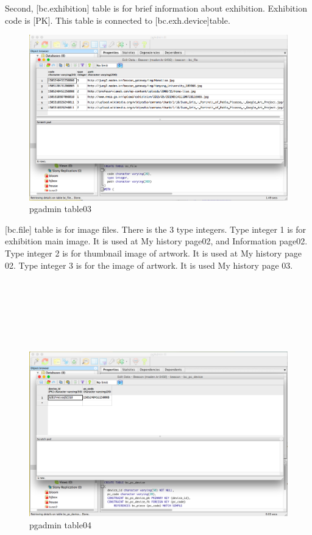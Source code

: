 \documentclass[conference]{IEEEtran}
\begin{document}
Second, [bc.exhibition] table is for  brief information about exhibition. Exhibition code is  [PK]. This table is connected to [bc.exh.device]table.\\

\begin{figure}[htbp]
\begin{center}
    \includegraphics[scale=0.2]{img_pgadmin003}
    \caption{pgadmin table03} 
\end{center}
\end{figure}

[bc.file] table is for image files. There is the 3 type integers. Type integer 1 is for exhibition main image. It is used at My history page02, and Information page02. Type integer 2 is for thumbnail image of artwork. It is used at My history page 02. Type integer 3 is for the image of artwork. It is used My history page 03.\\\\\\\\\\\\\\


\begin{figure}[htbp]
\begin{center}
    \includegraphics[scale=0.2]{img_pgadmin004}
    \caption{pgadmin table04} 
\end{center}
\end{figure}
\end{document}
